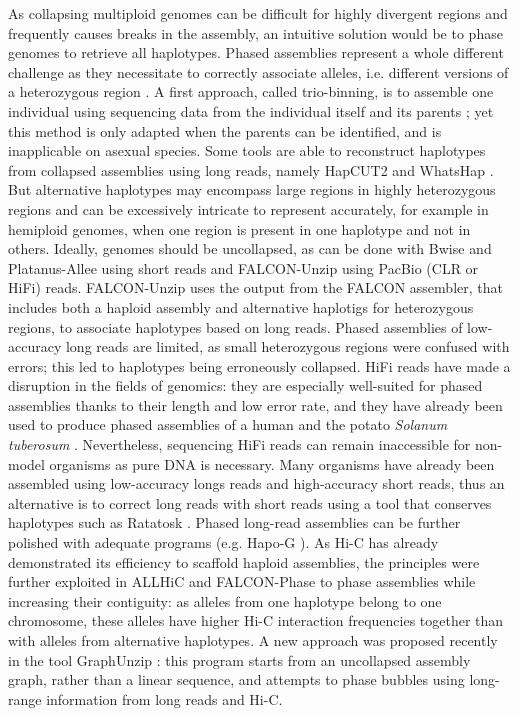 As collapsing multiploid genomes can be difficult for highly divergent regions and frequently causes breaks in the assembly, an intuitive solution would be to phase genomes to retrieve all haplotypes. Phased assemblies represent a whole different challenge as they necessitate to correctly associate alleles, i.e. different versions of a heterozygous region \cite{unzipping}. A first approach, called trio-binning, is to assemble one individual using sequencing data from the individual itself and its parents \cite{triocanu}; yet this method is only adapted when the parents can be identified, and is inapplicable on asexual species. Some tools are able to reconstruct haplotypes from collapsed assemblies using long reads, namely HapCUT2 \cite{hapcut2} and WhatsHap \cite{whatshap}. But alternative haplotypes may encompass large regions in highly heterozygous regions and can be excessively intricate to represent accurately, for example in hemiploid genomes, when one region is present in one haplotype and not in others. Ideally, genomes should be uncollapsed, as can be done with Bwise \cite{bwise} and Platanus-Allee \cite{platanus-allee} using short reads and FALCON-Unzip \cite{falcon-unzip} using PacBio (CLR or HiFi) reads. FALCON-Unzip uses the output from the FALCON assembler, that includes both a haploid assembly and alternative haplotigs for heterozygous regions, to associate haplotypes based on long reads. Phased assemblies of low-accuracy long reads are limited, as small heterozygous regions were confused with errors; this led to haplotypes being erroneously collapsed. HiFi reads have made a disruption in the fields of genomics: they are especially well-suited for phased assemblies thanks to their length and low error rate, and they have already been used to produce phased assemblies of a human \cite{phased_human} and the potato \textit{Solanum tuberosum} \cite{potato}. Nevertheless, sequencing HiFi reads can remain inaccessible for non-model organisms as pure DNA is necessary. Many organisms have already been assembled using low-accuracy longs reads and high-accuracy short reads, thus an alternative is to correct long reads with short reads using a tool that conserves haplotypes such as Ratatosk \cite{ratatosk}. Phased long-read assemblies can be further polished with adequate programs (e.g. Hapo-G \cite{hapog}). As Hi-C has already demonstrated its efficiency to scaffold haploid assemblies, the principles were further exploited in ALLHiC \cite{allhic} and FALCON-Phase \cite{falcon-phase} to phase assemblies while increasing their contiguity: as alleles from one haplotype belong to one chromosome, these alleles have higher Hi-C interaction frequencies together than with alleles from alternative haplotypes. A new approach was proposed recently in the tool GraphUnzip \cite{graphunzip}: this program starts from an uncollapsed assembly graph, rather than a linear sequence, and attempts to phase bubbles using long-range information from long reads and Hi-C. 

